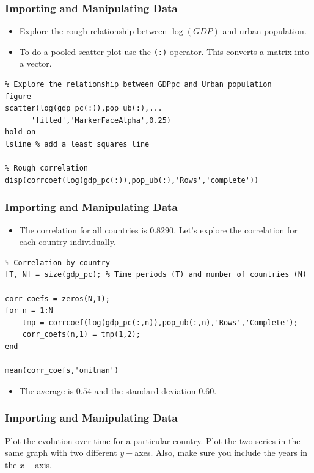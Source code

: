\documentclass[11pt,xcolor={svgnames},aspectratio=169,usepdftitle=false]{beamer}
\begin{document}
\begin{frame}[fragile]
  \frametitle{Importing and Manipulating Data}
\begin{itemize}
  \item Explore the rough relationship between $\log(GDP)$ and urban population.
  \item To do a pooled scatter plot use the \verb;(:); operator. This converts a matrix into a vector.
\end{itemize}
\begin{lstlisting}
% Explore the relationship between GDPpc and Urban population
figure
scatter(log(gdp_pc(:)),pop_ub(:),...
      'filled','MarkerFaceAlpha',0.25)
hold on
lsline % add a least squares line

% Rough correlation
disp(corrcoef(log(gdp_pc(:)),pop_ub(:),'Rows','complete'))
\end{lstlisting}
\end{frame}

\begin{frame}[fragile]
  \frametitle{Importing and Manipulating Data}
\begin{itemize}
  \item The correlation for all countries is $0.8290$. Let's explore the correlation for each country individually.
\end{itemize}
\begin{lstlisting}
% Correlation by country
[T, N] = size(gdp_pc); % Time periods (T) and number of countries (N)

corr_coefs = zeros(N,1);
for n = 1:N
    tmp = corrcoef(log(gdp_pc(:,n)),pop_ub(:,n),'Rows','Complete');
    corr_coefs(n,1) = tmp(1,2);
end

mean(corr_coefs,'omitnan')
\end{lstlisting}
\begin{itemize}
  \item The average is $0.54$ and the standard deviation $0.60$.
\end{itemize}
\end{frame}

\begin{frame}[fragile]
  \frametitle{Importing and Manipulating Data}
\begin{exercise}
Plot the evolution over time for a particular country. Plot the two series in the same graph with two different $y-$axes. Also, make sure you include the years in the $x-$axis.
\end{exercise}
\end{frame}
\end{document}

